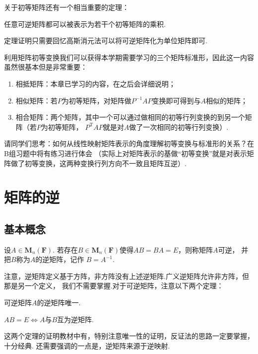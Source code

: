 关于初等矩阵还有一个相当重要的定理：

\begin{theorem}
    任意可逆矩阵都可以被表示为若干个初等矩阵的乘积.
\end{theorem}
定理证明只需要回忆高斯消元法可以将可逆矩阵化为单位矩阵即可.

利用矩阵初等变换我们可以获得本学期需要学习的三个矩阵标准形，因此这一内容虽然很基本但是非常重要：
\begin{enumerate}
    \item 相抵矩阵：本章已学习的内容，在之后会详细说明；
    \item 相似矩阵：若$P$为初等矩阵，对矩阵做$P^{-1}AP$变换即可得到与$A$相似的矩阵；
    \item 相合矩阵：两个矩阵，其中一个可以通过做相同的初等行列变换的到另一个矩阵（若$P$为初等矩阵，
    $P^{\mathrm{T}}AP$就是对$A$做了一次相同的初等行列变换）.
\end{enumerate}
请同学们思考：如何从线性映射矩阵表示的角度理解初等变换与标准形的关系？在B组习题中将有练习进行体会
（实际上对矩阵表示的基做``初等变换''就是对表示矩阵做了初等变换，这两种变换行列方向不一致且矩阵互逆）.

\section{矩阵的逆}
\subsection{基本概念}
\begin{definition}
    设$A \in \mathbf{M}_n(\mathbf{F})$. 若存在$B \in \mathbf{M}_n(\mathbf{F})$使得$AB=BA=E$，则称矩阵$A$可逆，
    并把$B$称为$A$的逆矩阵，记作 $ B = A^{-1} $.
\end{definition}
注意，逆矩阵定义基于方阵，非方阵没有上述逆矩阵.广义逆矩阵允许非方阵，但那是另一个定义，
我们不需要掌握.对于可逆矩阵，注意以下两个定理：
\begin{theorem}
    可逆矩阵$A$的逆矩阵唯一.
\end{theorem}
\begin{theorem}
    $AB=E \iff A$与$B$互为逆矩阵.
\end{theorem}
这两个定理的证明教材中有，特别注意唯一性的证明，反证法的思路一定要掌握，十分经典.
还需要强调的一点是，逆矩阵来源于逆映射.
